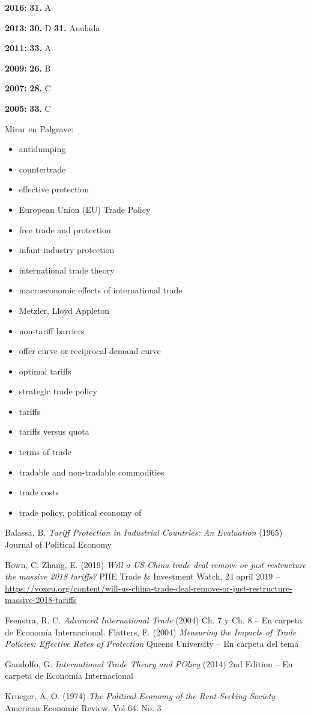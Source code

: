 \documentclass{nuevotema}
\begin{document}
\notas

\textbf{2016:} \textbf{31.} A

\textbf{2013:} \textbf{30.} D \textbf{31.} Anulada

\textbf{2011:} \textbf{33.} A

\textbf{2009:} \textbf{26.} B

\textbf{2007:} \textbf{28.} C

\textbf{2005:} \textbf{33.} C

\bibliografia

Mirar en Palgrave:
\begin{itemize}
	\item antidumping
	\item countertrade
	\item effective protection
	\item European Union (EU) Trade Policy
	\item free trade and protection
	\item infant-industry protection
	\item international trade theory
	\item macroeconomic effects of international trade
	\item Metzler, Lloyd Appleton
	\item non-tariff barriers
	\item offer curve or reciprocal demand curve
	\item optimal tariffs
	\item strategic trade policy
	\item tariffs
	\item tariffs versus quota
	\item terms of trade
	\item tradable and non-tradable commodities
	\item trade costs
	\item trade policy, political economy of
\end{itemize}

Balassa, B. \textit{Tariff Protection in Industrial Countries: An Evaluation} (1965) Journal of Political Economy

Bown, C. Zhang, E. (2019) \textit{Will a US-China trade deal remove or just restructure the massive 2018 tariffs?} PIIE Trade \& Investment Watch, 24 april 2019 -- \url{https://voxeu.org/content/will-us-china-trade-deal-remove-or-just-restructure-massive-2018-tariffs}

Feenstra, R. C. \textit{Advanced International Trade} (2004) Ch. 7 y Ch. 8 -- En carpeta de Economía Internacional. 
Flatters, F. (2004) \textit{Measuring the Impacts of Trade Policies: Effective Rates of Protection} Queens University -- En carpeta del tema

Gandolfo, G. \textit{International Trade Theory and POlicy} (2014) 2nd Edition -- En carpeta de Economía Internacional

Krueger, A. O. (1974) \textit{The Political Economy of the Rent-Seeking Society} American Economic Review. Vol 64. No. 3
\end{document}
